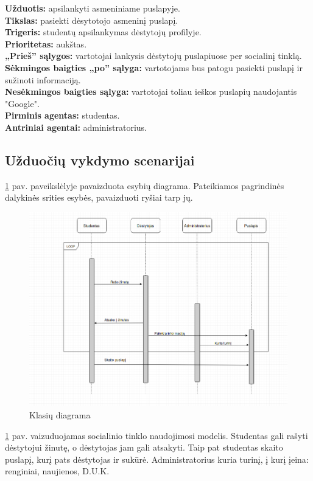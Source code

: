 \documentclass{VUMIFPSkursinis}
\begin{document}
\setlength{\parindent}{0pt} \textbf{Užduotis:} apsilankyti asmeniniame puslapyje. \\
\textbf{Tikslas:} pasiekti dėsytotojo asmeninį puslapį.\\
\textbf{Trigeris:} studentų apsilankymas dėstytojų profilyje. \\
\textbf{Prioritetas:} aukštas. \\
\textbf{„Prieš” sąlygos:} vartotojai lankysis dėstytojų puslapiuose per socialinį tinklą.\\
\textbf{Sėkmingos baigties „po” sąlyga:} vartotojams bus patogu pasiekti puslapį ir sužinoti informaciją. \\
\textbf{Nesėkmingos baigties sąlyga:} vartotojai toliau ieškos puslapių naudojantis "Google". \\
\textbf{Pirminis agentas:} studentas. \\
\textbf{Antriniai agentai:} administratorius.

\subsection{Užduočių vykdymo scenarijai}
\ref{fig:klasiu} pav. paveikslėlyje pavaizduota esybių diagrama. Pateikiamos pagrindinės dalykinės srities esybės, pavaizduoti ryšiai tarp jų.
\begin{figure}[H]
\centering
\includegraphics[width=\linewidth]{img/bendra-uml.png}
\caption{Klasių diagrama}
\label{fig:klasiu}
\end{figure}
\ref{fig:klasiu} pav. vaizuduojamas socialinio tinklo naudojimosi modelis. Studentas gali rašyti dėstytojui žinutę, o dėstytojas jam gali atsakyti. Taip pat studentas skaito puslapį, kurį pats dėstytojas ir sukūrė. Administratorius kuria turinį, į kurį įeina: renginiai, naujienos, D.U.K.
\end{document}
